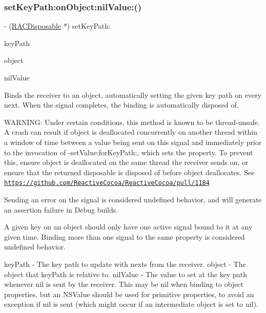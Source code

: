 \subsubsection{\texorpdfstring{set\+Key\+Path\+:on\+Object\+:nil\+Value\+:()}{setKeyPath:onObject:nilValue:()}\hspace{0.1cm}{\footnotesize\ttfamily [2/3]}}
{\footnotesize\ttfamily -\/ (\mbox{\hyperlink{interface_r_a_c_disposable}{R\+A\+C\+Disposable}} $\ast$) set\+Key\+Path\+: \begin{DoxyParamCaption}\item[{(N\+S\+String $\ast$)}]{key\+Path }\item[{onObject:(N\+S\+Object $\ast$)}]{object }\item[{nilValue:(id)}]{nil\+Value }\end{DoxyParamCaption}}

Binds the receiver to an object, automatically setting the given key path on every {\ttfamily next}. When the signal completes, the binding is automatically disposed of.

W\+A\+R\+N\+I\+NG\+: Under certain conditions, this method is known to be thread-\/unsafe. A crash can result if {\ttfamily object} is deallocated concurrently on another thread within a window of time between a value being sent on this signal and immediately prior to the invocation of -\/set\+Value\+:for\+Key\+Path\+:, which sets the property. To prevent this, ensure {\ttfamily object} is deallocated on the same thread the receiver sends on, or ensure that the returned disposable is disposed of before {\ttfamily object} deallocates. See \href{https://github.com/ReactiveCocoa/ReactiveCocoa/pull/1184}{\tt https\+://github.\+com/\+Reactive\+Cocoa/\+Reactive\+Cocoa/pull/1184}

Sending an error on the signal is considered undefined behavior, and will generate an assertion failure in Debug builds.

A given key on an object should only have one active signal bound to it at any given time. Binding more than one signal to the same property is considered undefined behavior.

key\+Path -\/ The key path to update with {\ttfamily next}s from the receiver. object -\/ The object that {\ttfamily key\+Path} is relative to. nil\+Value -\/ The value to set at the key path whenever {\ttfamily nil} is sent by the receiver. This may be nil when binding to object properties, but an N\+S\+Value should be used for primitive properties, to avoid an exception if {\ttfamily nil} is sent (which might occur if an intermediate object is set to {\ttfamily nil}).

